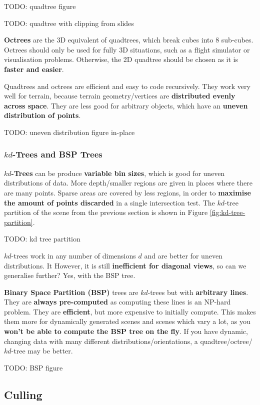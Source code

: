 \documentclass{article}
\begin{document}
TODO: quadtree figure

TODO: quadtree with clipping from slides

\textbf{Octrees} are the 3D equivalent of quadtrees, which break cubes into 8 sub-cubes. Octrees should only be used for fully 3D situations, such as a flight simulator or visualisation problems. Otherwise, the 2D quadtree should be chosen as it is \textbf{faster and easier}.

Quadtrees and octrees are efficient and easy to code recursively. They work very well for terrain, because terrain geometry/vertices are \textbf{distributed evenly across space}. They are less good for arbitrary objects, which have an \textbf{uneven distribution of points}.

TODO: uneven distribution figure in-place

\subsubsection{$kd$-Trees and BSP Trees}

\textbf{$kd$-Trees} can be produce \textbf{variable bin sizes}, which is good for uneven distributions of data. More depth/smaller regions are given in places where there are many points. Sparse areas are covered by less regions, in order to \textbf{maximise the amount of points discarded} in a single intersection test. The $kd$-tree partition of the scene from the previous section is shown in Figure \ref{fig:kd-tree-partition}.

TODO: kd tree partition

$kd$-trees work in any number of dimensions $d$ and are better for uneven distributions. It However, it is still \textbf{inefficient for diagonal views}, so can we generalise further? Yes, with the BSP tree.

\textbf{Binary Space Partition (BSP)} trees are $kd$-trees but with \textbf{arbitrary lines}. They are \textbf{always pre-computed} as computing these lines is an NP-hard problem. They are \textbf{efficient}, but more expensive to initially compute. This makes them more for dynamically generated scenes and scenes which vary a lot, as you \textbf{won't be able to compute the BSP tree on the fly}. If you have dynamic, changing data with many different distributions/orientations, a quadtree/octree/$kd$-tree may be better.

TODO: BSP figure

\subsection{Culling}
\end{document}
